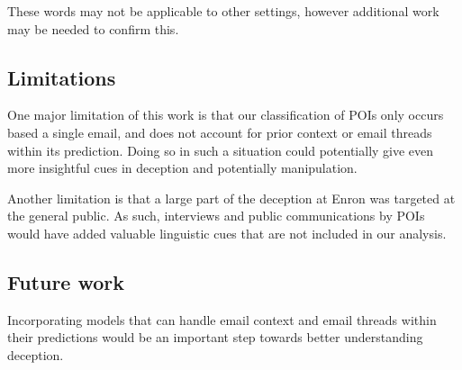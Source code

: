 These words may not be applicable to other settings, however additional work may be needed to confirm this.

\subsection{Limitations}

One major limitation of this work is that our classification of POIs only occurs based a single email, and does not account for prior context or email threads within its prediction. Doing so in such a situation could potentially give even more insightful cues in deception and potentially manipulation.


Another limitation is that a large part of the deception at Enron was targeted at the general public. As such, interviews and public communications by POIs would have added valuable linguistic cues that are not included in our analysis. 

\subsection{Future work} 

Incorporating models that can handle email context and email threads within their predictions would be an important step towards better understanding deception. 

